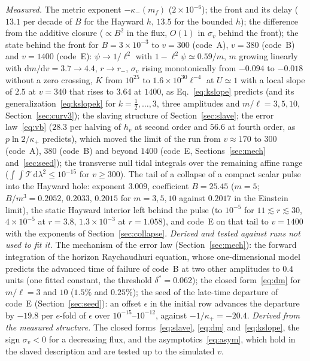 \documentclass[11pt]{article}
\begin{document}
\emph{Measured.} The metric exponent $-\kappa_-(m_f)$ ($2\times10^{-6}$); the front and its delay ($13.1$ per decade of $B$ for the Hayward $h$, $13.5$ for the bounded $h$); the difference from the additive closure ($\propto B^{2}$ in the flux, $O(1)$ in $\sigma_v$ behind the front); the state behind the front for $B=3\times10^{-3}$ to $v=300$ (code~A), $v=380$ (code~B) and $v=1400$ (code~E): $\psi\to1/\ell^{2}$ with $1-\ell^{2}\psi\simeq0.59/m$, $m$ growing linearly with $\mathrm{d}m/\mathrm{d}v=3.7\to4.4$, $r\to r_-$, $\sigma_v$ rising monotonically from $-0.094$ to $-0.018$ without a zero crossing, $K$ from $10^{25}$ to $1.6\times10^{30}\ell^{-4}$ at $U\simeq1$ with a local slope of $2.5$ at $v=340$ that rises to $3.64$ at $1400$, as Eq.~\eqref{eq:kslope} predicts (and its generalization~\eqref{eq:kslopek} for $k=\tfrac12,\ldots,3$, three amplitudes and $m/\ell=3,5,10$, Section~\ref{sec:curv3}); the slaving structure of Section~\ref{sec:slave}; the error law~\eqref{eq:vb} ($28.3$ per halving of $h_v$ at second order and $56.6$ at fourth order, as $p\ln2/\kappa_+$ predicts), which moved the limit of the run from $v\approx170$ to $300$ (code~A), $380$ (code~B) and beyond $1400$ (code~E, Sections~\ref{sec:mech} and~\ref{sec:seed}); the transverse null tidal integrals over the remaining affine range ($\int\!\!\int\mathcal T\,\mathrm d\lambda^{2}\le10^{-15}$ for $v\ge300$). The tail of a collapse of a compact scalar pulse into the Hayward hole: exponent $3.009$, coefficient $B=25.45$ ($m=5$; $B/m^{3}=0.2052,\,0.2033,\,0.2015$ for $m=3,5,10$ against $0.2017$ in the Einstein limit), the static Hayward interior left behind the pulse (to $10^{-5}$ for $11\lesssim r\lesssim30$, $4\times10^{-5}$ at $r=3.8$, $1.3\times10^{-3}$ at $r=1.058$), and code~E on that tail to $v=1400$ with the exponents of Section~\ref{sec:collapse}.
\emph{Derived and tested against runs not used to fit it.} The mechanism of the error law (Section~\ref{sec:mech}): the forward integration of the horizon Raychaudhuri equation, whose one-dimensional model predicts the advanced time of failure of code~B at two other amplitudes to $0.4$ units (one fitted constant, the threshold $\delta^{*}=0.062$); the closed form~\eqref{eq:dm} for $m/\ell=3$ and $10$ ($1.5\%$ and $0.25\%$); the seed of the late-time departure of code~E (Section~\ref{sec:seed}): an offset $\epsilon$ in the initial row advances the departure by $-19.8$ per $e$-fold of $\epsilon$ over $10^{-15}$--$10^{-12}$, against $-1/\kappa_+=-20.4$.
\emph{Derived from the measured structure.} The closed forms~\eqref{eq:slave}, \eqref{eq:dm} and~\eqref{eq:kslope}, the sign $\sigma_v<0$ for a decreasing flux, and the asymptotics~\eqref{eq:asym}, which hold in the slaved description and are tested up to the simulated $v$.
\end{document}
